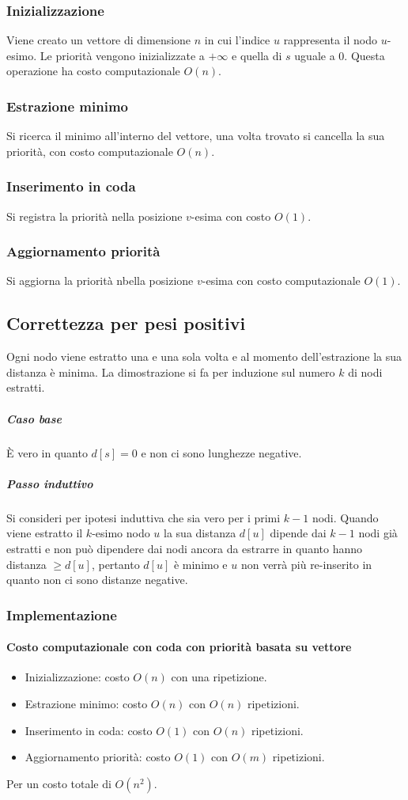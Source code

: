 	\subsubsection{Inizializzazione}
	Viene creato un vettore di dimensione $n$ in cui l'indice $u$ rappresenta il nodo $u$-esimo. Le
	priorit\`a vengono inizializzate a $+\infty$ e quella di $s$ uguale a $0$. Questa operazione ha
	costo computazionale $O(n)$.
	\subsubsection{Estrazione minimo}
	Si ricerca il minimo all'interno del vettore, una volta trovato si cancella la sua priorit\`a, con
	costo computazionale $O(n)$.
	\subsubsection{Inserimento in coda}
	Si registra la priorit\`a nella posizione $v$-esima con costo $O(1)$.
	\subsubsection{Aggiornamento priorit\`a}
	Si aggiorna la priorit\`a nbella posizione $v$-esima con costo computazionale $O(1)$.
	\subsection{Correttezza per pesi positivi}
	Ogni nodo viene estratto una e una sola volta e al momento dell'estrazione la sua distanza \`e
	minima. La dimostrazione si fa per induzione sul numero $k$ di nodi estratti.
	\subparagraph{Caso base}
	\`E vero in quanto $d[s]=0$ e non ci sono lunghezze negative.
	\subparagraph{Passo induttivo}
	Si consideri per ipotesi induttiva che sia vero per i primi $k-1$ nodi. Quando viene estratto il
	$k$-esimo nodo $u$ la sua distanza $d[u]$ dipende dai $k-1$ nodi gi\`a estratti e non pu\`o
	dipendere dai nodi ancora da estrarre in quanto hanno distanza $\ge d[u]$, pertanto $d[u]$ \`e
	minimo e $u$ non verr\`a pi\`u re-inserito in quanto non ci sono distanze negative.
	\subsubsection{Implementazione}
	
	\paragraph{Costo computazionale con coda con priorit\`a basata su vettore}
	\begin{itemize}
		\item Inizializzazione: costo $O(n)$ con una ripetizione.
		\item Estrazione minimo: costo $O(n)$ con $O(n)$ ripetizioni.
		\item Inserimento in coda: costo $O(1)$ con $O(n)$ ripetizioni.
		\item Aggiornamento priorit\`a: costo $O(1)$ con $O(m)$ ripetizioni.
	\end{itemize}
	Per un costo totale di $O(n^2)$.
